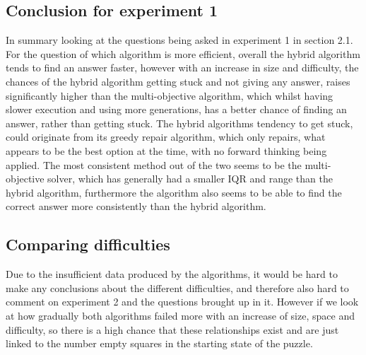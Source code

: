 \documentclass[a4paper,11pt]{article}
\begin{document}
\subsection{Conclusion for experiment 1}
In summary looking at the questions being asked in experiment 1 in section 2.1. For the question of which algorithm is more efficient, overall the hybrid algorithm tends to find an answer faster, however with an increase in size and difficulty, the chances of the hybrid algorithm getting stuck and not giving any answer, raises significantly higher than the multi-objective algorithm, which whilst having slower execution and using more generations, has a better chance of finding an answer, rather than getting stuck. The hybrid algorithms tendency to get stuck, could originate from its greedy repair algorithm, which only repairs, what appears to be the best option at the time, with no forward thinking being applied. The most consistent method out of the two seems to be the multi-objective solver, which has generally had a smaller IQR and range than the hybrid algorithm, furthermore the algorithm also seems to be able to find the correct answer more consistently than the hybrid algorithm.  


\subsection{Comparing difficulties}
Due to the insufficient data produced by the algorithms, it would be hard to make any conclusions about the different difficulties, and therefore also hard to comment on experiment 2 and the questions brought up in it. However if we look at how gradually both algorithms failed more with an increase of size, space and difficulty, so there is a high chance that these relationships exist and are just linked to the number empty squares in the starting state of the puzzle.
\end{document}
